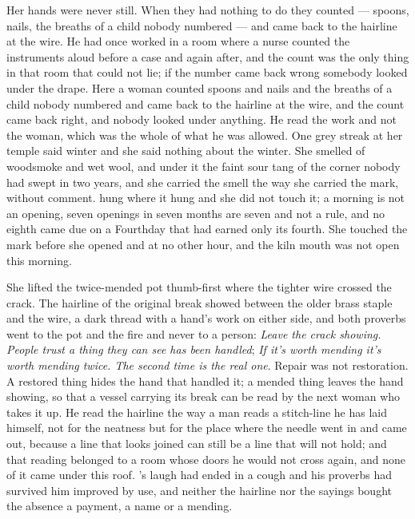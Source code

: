 Her hands were never still. When they had nothing to do they counted --- spoons, nails, the breaths of a child nobody numbered --- and came back to the hairline at the wire. He had once worked in a room where a nurse counted the instruments aloud before a case and again after, and the count was the only thing in that room that could not lie; if the number came back wrong somebody looked under the drape. Here a woman counted spoons and nails and the breaths of a child nobody numbered and came back to the hairline at the wire, and the count came back right, and nobody looked under anything. He read the work and not the woman, which was the whole of what he was allowed. One grey streak at her temple said winter and she said nothing about the winter. She smelled of woodsmoke and wet wool, and under it the faint sour tang of the corner nobody had swept in two years, and she carried the smell the way she carried the mark, without comment.  hung where it hung and she did not touch it; a morning is not an opening, seven openings in seven months are seven and not a rule, and no eighth came due on a Fourthday that had earned only its fourth. She touched the mark before she opened  and at no other hour, and the kiln mouth was not open this morning.

She lifted the twice-mended pot thumb-first where the tighter wire crossed the crack. The hairline of the original break showed between the older brass staple and the wire, a dark thread with a hand's work on either side, and both proverbs went to the pot and the fire and never to a person: \emph{Leave the crack showing. People trust a thing they can see has been handled}; \emph{If it's worth mending it's worth mending twice. The second time is the real one}. Repair was not restoration. A restored thing hides the hand that handled it; a mended thing leaves the hand showing, so that a vessel carrying its break can be read by the next woman who takes it up. He read the hairline the way a man reads a stitch-line he has laid himself, not for the neatness but for the place where the needle went in and came out, because a line that looks joined can still be a line that will not hold; and that reading belonged to a room whose doors he would not cross again, and none of it came under this roof. 's laugh had ended in a cough and his proverbs had survived him improved by use, and neither the hairline nor the sayings bought the absence a payment, a name or a mending.

